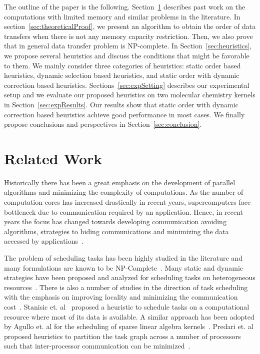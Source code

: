 \documentclass[sigconf]{acmart}
\begin{document}
	The outline of the paper is the following. Section~\ref{sec:relatedWork} describes past work on the computations with limited memory and similar problems in the literature. In section~\ref{sec:theoreticalProof}, we present an algorithm to obtain the order of data transfers when there is not any memory capacity restriction. Then, we also prove that in general data transfer problem is NP-complete. In Section~\ref{sec:heuristics}, we propose several heuristics and discuss the conditions that might be favorable to them. We mainly consider three categories of heuristics: static order based heuristics, dynamic selection based heuristics, and static order with dynamic correction based heuristics. Sections~\ref{sec:expSetting} describes our experimental setup and we evaluate our proposed heuristics on two molecular chemistry kernels in Section~\ref{sec:expResults}. Our results show that static order with dynamic correction based heuristics achieve good performance in most cases. We finally propose conclusions and perspectives in Section~\ref{sec:conclusion}.
	
	\section{Related Work}
	\label{sec:relatedWork}
	
	Historically there has been a great emphasis on the development of parallel algorithms and minimizing the complexity of computations. As the number of computation cores has increased drastically in recent years, supercomputers face bottleneck due to communication required by an application. Hence, in recent years the focus has changed towards developing communication avoiding algorithms, strategies to hiding communications and minimizing the data accessed by applications~\cite{yelick2016}. 
	
	
	The problem of scheduling tasks has been highly studied in the literature and many formulations are known to be NP-Complete~\cite{GareyJohnson}. Many static and dynamic strategies have been proposed and analyzed for scheduling tasks on heterogeneous resources~\cite{heft-Topcuoglu,ipdps16starpu}. There is also a number of studies in the direction of task scheduling with the emphasis on improving locality and minimizing the communication cost~\cite{starpu,heft-Topcuoglu}. Stanisic et. al~\cite{luka-dmdar} proposed a heuristic to schedule tasks on a computational resource where most of its data is available. A similar approach has been adopted by Agullo et. al for the scheduling of sparse linear algebra kernels~\cite{agullo_fmm}. Predari et. al proposed heuristics to partition the task graph across a number of processors such that inter-processor communication can be minimized~\cite{predari:tel-01518956}.
	
\end{document}
